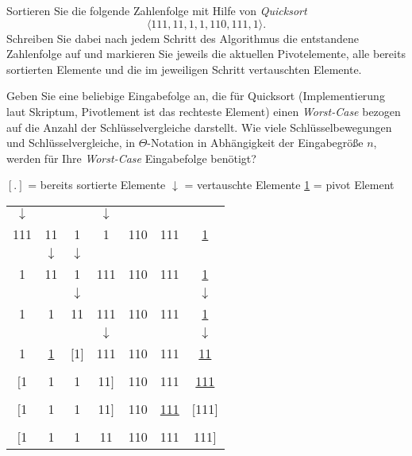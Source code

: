 \documentclass[a4paper, 12pt]{article}
\begin{document}




\begin{angabe}
Sortieren Sie die folgende Zahlenfolge mit Hilfe von \textit{Quicksort}
\[
\langle 111, 11, 1, 1, 110, 111, 1  \rangle.
\]
Schreiben Sie dabei nach jedem Schritt des Algorithmus die entstandene
Zahlenfolge auf und markieren Sie jeweils die aktuellen Pivotelemente,
alle bereits sortierten Elemente und die im jeweiligen Schritt
vertauschten Elemente.

Geben Sie eine beliebige Eingabefolge an, die für Quicksort
(Implementierung laut Skriptum, Pivotlement ist das rechteste Element) 
einen \emph{Worst-Case} bezogen auf die
Anzahl der Schlüsselvergleiche darstellt.  Wie viele Schlüsselbewegungen
und Schlüsselvergleiche, in $\Theta$-Notation in Abhängigkeit der
Eingabegröße $n$, werden für Ihre \emph{Worst-Case} Eingabefolge benötigt?



\end{angabe}

$[.]$ = bereits sortierte Elemente
\newline
$\downarrow$ = vertauschte Elemente
\newline
\underline{1} = pivot Element



\begin{tabular}{ c c c c c c c }
\hline
$\downarrow$ & & & $\downarrow$ & & & \\
111 & 11 & 1 & 1 & 110 & 111 & \underline{1} \\
\hline
 & $\downarrow$ & $\downarrow$ &  & & & \\
1 & 11 & 1 & 111 & 110 & 111 & \underline{1} \\
\hline
 &  & $\downarrow$ &  & & & $\downarrow$\\
1 & 1 & 11 & 111 & 110 & 111 & \underline{1} \\
\hline
 &  &  & $\downarrow$ & & & $\downarrow$\\
1 & \underline{1} & $[$1$]$ & 111 & 110 & 111 & \underline{11} \\
\hline
&  &  &  & & &\\
$[$1 & 1 & 1 & 11$]$ & 110 & 111 & \underline{111} \\
\hline
&  &  &  & & &\\
$[$1 & 1 & 1 & 11$]$ & 110 & \underline{111} & $[$111$]$ \\
\hline
&  &  &  & & &\\
$[$1 & 1 & 1 & 11 & 110 & 111 & 111$]$ \\
\hline


\end{tabular}
\end{document}
